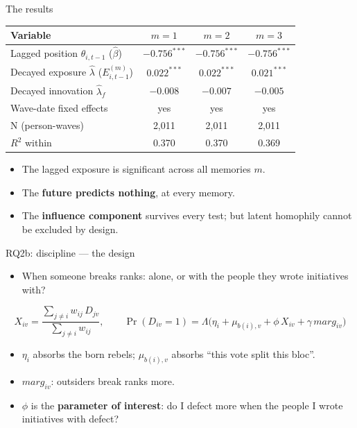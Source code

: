 \documentclass[aspectratio=169,11pt]{beamer}
\newcommand{\emphr}[1]{{\color{ndreddark}\textbf{#1}}}
\begin{document}


\begin{frame}{The results}
\begin{center}\small
\begin{tabular}{lccc}
\toprule
Variable & $m = 1$ & $m = 2$ & $m = 3$ \\
\midrule
Lagged position $\theta_{i,t-1}$ ($\hat\beta$) & $-0.756^{***}$ & $-0.756^{***}$ & $-0.756^{***}$ \\
Decayed exposure $\hat\lambda$ ($E^{(m)}_{i,t-1}$) & $\mathbf{0.022^{***}}$ & $\mathbf{0.022^{***}}$ & $\mathbf{0.021^{***}}$ \\
Decayed innovation $\hat\lambda_f$ & $-0.008$ & $-0.007$ & $-0.005$ \\
Wave-date fixed effects & yes & yes & yes \\
N (person-waves) & 2,011 & 2,011 & 2,011 \\
$R^2$ within & 0.370 & 0.370 & 0.369 \\
\bottomrule
\end{tabular}
\end{center}
\vspace{0.25cm}
\begin{itemize}
  \item The lagged exposure is significant across all memories $m$.
  \item The \emphr{future predicts nothing}, at every memory.
  \item The \emphr{influence component} survives every test; but latent homophily cannot be excluded by design.
\end{itemize}
\end{frame}



\begin{frame}{RQ2b: discipline — the design}
\begin{itemize}
  \item When someone breaks ranks: alone, or with the people they wrote initiatives with?
\end{itemize}
\vspace{0.2cm}
$$X_{iv} = \frac{\sum_{j \neq i} w_{ij}\, D_{jv}}{\sum_{j \neq i} w_{ij}},
\qquad
\Pr(D_{iv} = 1) = \Lambda\big(\eta_i + \mu_{b(i),v} + \phi\, X_{iv} + \gamma\, marg_{iv}\big)$$
\begin{itemize}
  \item $\eta_i$ absorbs the born rebels; $\mu_{b(i),v}$ absorbs ``this vote split this bloc''.
  \item $marg_{iv}$: outsiders break ranks more.
  \item $\phi$ is the \emphr{parameter of interest}: do I defect more when the people I wrote initiatives with defect?
\end{itemize}
\end{frame}
\end{document}
